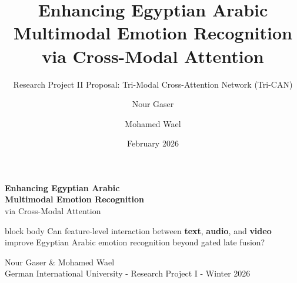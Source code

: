 \documentclass[aspectratio=169,10pt]{beamer}
\title[Tri-CAN for Egyptian Arabic MER]{Enhancing Egyptian Arabic Multimodal Emotion Recognition via Cross-Modal Attention}
\subtitle{Research Project II Proposal: Tri-Modal Cross-Attention Network (Tri-CAN)}
\author[N. Gaser \& M. Wael]{Nour Gaser \and Mohamed Wael}
\institute[GIU]{German International University\\Research Project I - Winter 2026}
\date{February 2026}
\newcommand{\term}[1]{\textbf{\textcolor{MidBlue}{#1}}}
\begin{document}
{
\begin{frame}[plain]
\vspace{0.75cm}
\begin{center}
{\color{white}\LARGE\bfseries Enhancing Egyptian Arabic\\[0.15cm]
Multimodal Emotion Recognition}\\[0.35cm]
{\color{AccentBlue!25!white}\Large via Cross-Modal Attention}\\[0.65cm]
\begin{beamercolorbox}[rounded=true,sep=0.35cm,wd=0.78\linewidth]{block body}
\centering
\small Can feature-level interaction between \term{text}, \term{audio}, and \term{video} improve Egyptian Arabic emotion recognition beyond gated late fusion?
\end{beamercolorbox}
\vspace{0.65cm}
{\color{white}\normalsize Nour Gaser \quad \& \quad Mohamed Wael}\\[0.15cm]
{\color{white!70}\small German International University - Research Project I - Winter 2026}
\end{center}
\end{frame}
}
\end{document}
